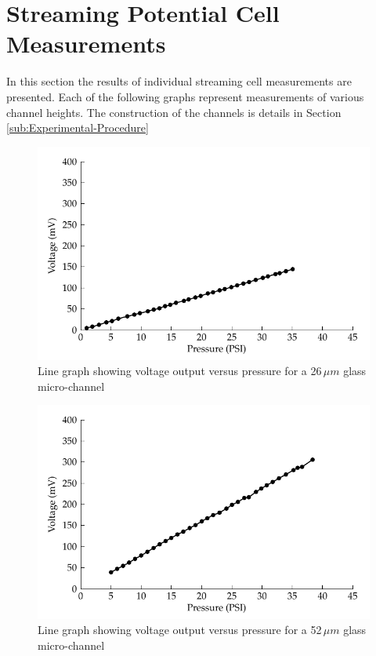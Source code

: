 
\section{\label{sec:Appendix-Streaming-Potential-Cell}Streaming Potential
Cell Measurements}

In this section the results of individual streaming cell measurements
are presented. Each of the following graphs represent measurements
of various channel heights. The construction of the channels is details
in Section \ref{sub:Experimental-Procedure}

\begin{figure}
\begin{centering}
\includegraphics{content/appendices/streamingCellMeasurements/graphics/streamingCell_voltVsPress_26um_out}
\par\end{centering}

\protect\caption{Line graph showing voltage output versus pressure for a 26$\,\mu m$
glass micro-channel}


\end{figure}
\begin{figure}
\begin{centering}
\includegraphics{content/appendices/streamingCellMeasurements/graphics/streamingCell_voltVsPress_52um_out}
\par\end{centering}

\protect\caption{Line graph showing voltage output versus pressure for a 52$\,\mu m$
glass micro-channel}
\end{figure}
